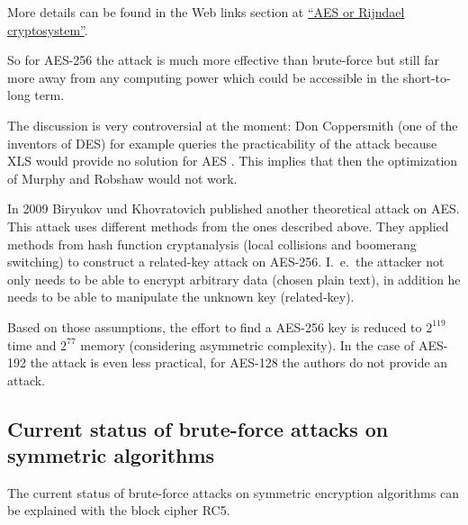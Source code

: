 More details can be found in the Web links section at
\hyperlink{CM_HT_Weblink_Rijndael-Cryptosystem}{``AES or Rijndael cryptosystem''}.

So for AES-256 the attack is much more effective than brute-force but still far more away from any computing power which could be accessible in the short-to-long term. 

The discussion is very controversial at the moment: Don Coppersmith (one of the
inventors of DES) for example queries the practicability of the attack because
XLS would provide no solution for AES \cite{cm:Coppersmith2002}. This implies that
then the optimization of Murphy and Robshaw \cite{cm:Robshaw2002b} would not work.

In 2009 Biryukov und Khovratovich \cite{cm:Biryukov2009} published another
theoretical attack on AES. This attack uses different methods from the ones
described above. They applied methods from hash function cryptanalysis (local
collisions and boomerang switching) to construct a related-key attack on
AES-256. I.~e.\ the attacker not only needs to be able to encrypt arbitrary data
(chosen plain text), in addition he needs to be able to manipulate the unknown key
(related-key). 

Based on those assumptions, the effort to find a AES-256 key is reduced to
$2^{119}$ time and $2^{77}$ memory (considering asymmetric complexity).
In the case of AES-192 the attack is even less practical, for AES-128
the authors do not provide an attack.


\subsection{Current status of brute-force attacks on symmetric algorithms}
\label{Brute-force-gegen-Symmetr}

The current status of brute-force attacks on symmetric encryption algorithms can be explained with the block cipher RC5.

